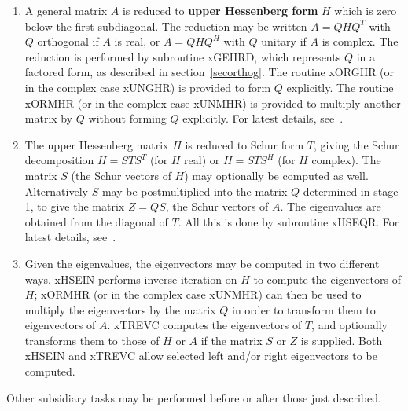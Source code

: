 \begin{enumerate}

\item A general matrix $A$ is reduced to {\bf upper Hessenberg form} $H$
which is zero below the first subdiagonal. The reduction may be written
$A=QHQ^T$ with $Q$ orthogonal if $A$ is real, or
$A=QHQ^H$ with $Q$ unitary if $A$ is complex.
The reduction is performed by subroutine xGEHRD, 
which represents $Q$ in a factored form, as described in section~\ref{secorthog}.
The routine xORGHR (or in the complex case xUNGHR) is provided to
form $Q$ explicitly.
The routine xORMHR (or in the complex case xUNMHR) is provided to
multiply another matrix by $Q$ without forming $Q$ explicitly.
For latest details, see~\cite{ortigeijn06}.

\item The upper Hessenberg matrix $H$ is reduced to Schur form $T$,
giving the Schur decomposition $H=STS^T$
(for $H$ real) or $H=STS^H$ (for $H$ complex). The matrix $S$ (the Schur vectors
of $H$) may
optionally be computed as well. Alternatively $S$ may be postmultiplied
into the matrix $Q$ determined in stage 1, to give the matrix $Z = Q S$, the
Schur vectors of $A$. The eigenvalues are obtained from the
diagonal of $T$. All this is done by subroutine xHSEQR.
For latest details, see~\cite{bramanetal02a, bramanetal02b}.

\item Given the eigenvalues, the eigenvectors  may be computed in
two different ways. xHSEIN
 performs inverse iteration on $H$ to compute
the eigenvectors of $H$;
xORMHR (or in the complex case xUNMHR)
 can then be used to multiply the eigenvectors by the matrix $Q$
in order to transform them to eigenvectors of $A$.
xTREVC computes the eigenvectors of $T$, and optionally transforms them
to those of $H$ or $A$ if the matrix $S$ or $Z$ is supplied.
Both xHSEIN and xTREVC allow selected left and/or right eigenvectors
to be computed.

\end{enumerate}

Other subsidiary tasks may be performed before or after those just described.

